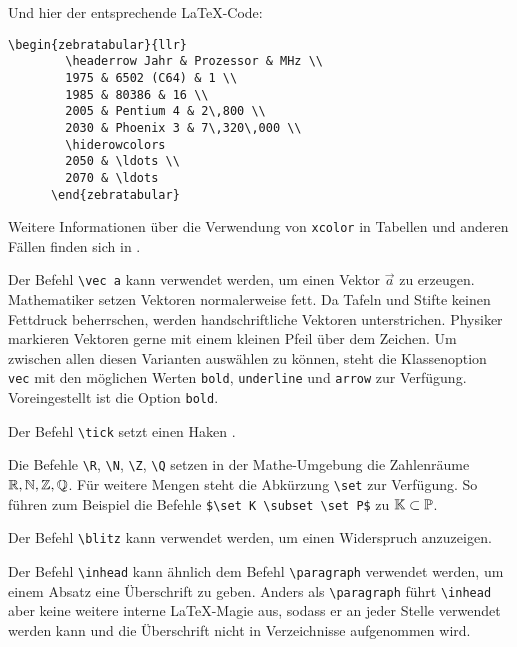 \documentclass{exercise}
\begin{document}
    Und hier der entsprechende \LaTeX-Code:

    \begin{lstlisting}[gobble=6]
      \begin{zebratabular}{llr}
        \headerrow Jahr & Prozessor & MHz \\
        1975 & 6502 (C64) & 1 \\
        1985 & 80386 & 16 \\
        2005 & Pentium 4 & 2\,800 \\
        2030 & Phoenix 3 & 7\,320\,000 \\
        \hiderowcolors
        2050 & \ldots \\
        2070 & \ldots
      \end{zebratabular}
    \end{lstlisting}

    Weitere Informationen über die Verwendung von \texttt{xcolor} in Tabellen
    und anderen Fällen finden sich in \cite{uwe-xcolor}.

    Der Befehl \lstinline-\vec a- kann verwendet werden, um einen Vektor $\vec a$
    zu erzeugen. Mathematiker setzen Vektoren normalerweise fett.
    Da Tafeln und Stifte keinen Fettdruck
    beherrschen, werden handschriftliche Vektoren unterstrichen.
    Physiker markieren
    Vektoren gerne mit einem kleinen Pfeil über dem Zeichen. Um zwischen allen
    diesen Varianten auswählen zu können, steht die Klassenoption
    \lstinline-vec- mit den möglichen Werten \lstinline-bold-,
    \lstinline-underline- und \lstinline-arrow- zur Verfügung.
    Voreingestellt ist die Option \lstinline-bold-.

    Der Befehl \lstinline-\tick- setzt einen Haken \tick.

    Die Befehle \lstinline-\R-, \lstinline-\N-, \lstinline-\Z-, \lstinline-\Q- setzen in der Mathe-Umgebung die Zahlenräume $\mathbb{R}, \mathbb{N}, \mathbb{Z}, \mathbb{Q}$. Für weitere Mengen steht die Abkürzung \lstinline-\set- zur
    Verfügung. So führen zum Beispiel die Befehle \lstinline-$\set K \subset \set P$- zu $\mathbb{K} \subset \mathbb{P}$.

    Der Befehl \lstinline-\blitz- kann verwendet werden, um einen Widerspruch anzuzeigen. \blitz

     Der Befehl \lstinline-\inhead- kann ähnlich dem Befehl \lstinline-\paragraph- verwendet werden, um einem Absatz eine Überschrift zu geben. Anders als \lstinline-\paragraph- führt \lstinline-\inhead- aber keine weitere interne \LaTeX{}-Magie aus, sodass er an jeder Stelle verwendet werden kann und die Überschrift nicht in Verzeichnisse aufgenommen wird.
\end{document}
